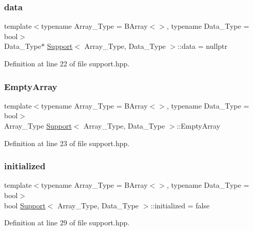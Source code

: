 \subsubsection{\texorpdfstring{data}{data}}
{\footnotesize\ttfamily template$<$typename Array\+\_\+\+Type  = B\+Array$<$$>$, typename Data\+\_\+\+Type  = bool$>$ \\
Data\+\_\+\+Type$\ast$ \hyperlink{class_support}{Support}$<$ Array\+\_\+\+Type, Data\+\_\+\+Type $>$\+::data = nullptr}



Definition at line 22 of file support.\+hpp.

\mbox{\label{class_support_a9364028f9966697e3cdd3fc6a5cd90de}} 
\subsubsection{\texorpdfstring{Empty\+Array}{EmptyArray}}
{\footnotesize\ttfamily template$<$typename Array\+\_\+\+Type  = B\+Array$<$$>$, typename Data\+\_\+\+Type  = bool$>$ \\
Array\+\_\+\+Type \hyperlink{class_support}{Support}$<$ Array\+\_\+\+Type, Data\+\_\+\+Type $>$\+::Empty\+Array}



Definition at line 23 of file support.\+hpp.

\mbox{\label{class_support_ac352c6473720fcdcd9895c48bd872ef5}} 
\subsubsection{\texorpdfstring{initialized}{initialized}}
{\footnotesize\ttfamily template$<$typename Array\+\_\+\+Type  = B\+Array$<$$>$, typename Data\+\_\+\+Type  = bool$>$ \\
bool \hyperlink{class_support}{Support}$<$ Array\+\_\+\+Type, Data\+\_\+\+Type $>$\+::initialized = false}



Definition at line 29 of file support.\+hpp.

\mbox{\label{class_support_ace1d46b871c67caa774ac2269930e97f}} 

